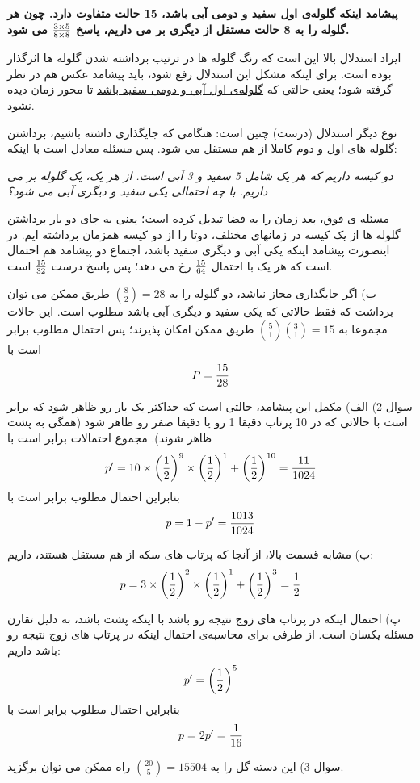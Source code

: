 \documentclass[10pt,letterpaper]{report}
\begin{document}
\textbf{
پیشامد اینکه \underline{گلوله‌ی اول سفید و دومی آبی باشد}، 15 حالت متفاوت دارد. چون هر گلوله را به 8 حالت مستقل از دیگری بر می داریم، پاسخ 
$
3\times 5\over 8\times 8
$
می شود.
}

ایراد استدلال بالا این است که رنگ گلوله ها در ترتیب برداشته شدن گلوله ها اثرگذار بوده است. برای اینکه مشکل این استدلال رفع شود، باید پیشامد عکس هم در نظر گرفته شود؛ یعنی حالتی که \underline{گلوله‌ی اول آبی و دومی سفید باشد} تا محور زمان دیده نشود.

نوع دیگر استدلال (درست) چنین است: هنگامی که جایگذاری داشته باشیم، برداشتن گلوله های اول و دوم کاملا از هم مستقل می شود. پس مسئله معادل است با اینکه:

\textit{
دو کیسه داریم که هر یک شامل 5 سفید و 3 آبی است. از هر یک، یک گلوله بر می داریم. با چه احتمالی یکی سفید و دیگری آبی می شود؟
}

مسئله ی فوق، بعد زمان را به فضا تبدیل کرده است؛ یعنی به جای دو بار برداشتن گلوله ها از یک کیسه در زمانهای مختلف، دوتا را از دو کیسه همزمان برداشته ایم. در اینصورت پیشامد اینکه یکی آبی و دیگری سفید باشد، اجتماع دو پیشامد هم احتمال است که هر یک با احتمال
$
15\over 64
$
رخ می دهد؛ پس پاسخ درست 
$
15\over 32
$
است.

ب) اگر جایگذاری مجاز نباشد، دو گلوله را به 
$
\binom{8}{2}=28
$
طریق ممکن می توان برداشت که فقط حالاتی که یکی سفید و دیگری آبی باشد مطلوب است. این حالات مجموعا به 
$
\binom{5}{1}\binom{3}{1}=15
$
طریق ممکن امکان پذیرند؛ پس احتمال مطلوب برابر است با
$$
P={15\over 28}
$$

سوال 2) الف) مکمل این پیشامد، حالتی است که حداکثر یک بار رو ظاهر شود که برابر است با حالاتی که در 10 پرتاب دقیقا 1 رو یا دقیقا صفر رو ظاهر شود (همگی به پشت ظاهر شوند). مجموع احتمالات برابر است با
$$
p'=10\times \left({1\over 2}\right)^9\times \left({1\over 2}\right)^1 +\left({1\over 2}\right)^{10}={11\over 1024}
$$
بنابراین احتمال مطلوب برابر است با
$$
p=1-p'={1013\over 1024}
$$

ب) مشابه قسمت بالا، از آنجا که پرتاب های سکه از هم مستقل هستند، داریم:
$$
p=3\times \left({1\over 2}\right)^2\times \left({1\over 2}\right)^1 +\left({1\over 2}\right)^{3}={1\over2}
$$

پ) احتمال اینکه در پرتاب های زوج نتیجه رو باشد با اینکه پشت باشد، به دلیل تقارن مسئله یکسان است. از طرفی برای محاسبه‌ی احتمال اینکه در پرتاب های زوج نتیجه رو باشد داریم:
$$
p'=\left({1\over 2}\right)^5
$$
بنابراین احتمال مطلوب برابر است با
$$
p=2p'={1\over 16}
$$

سوال 3) این دسته گل را به 
$
\binom{20}{5}=15504
$
راه ممکن می توان برگزید.
\end{document}
